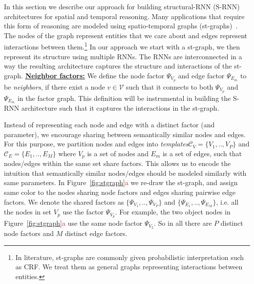 \documentclass[10pt,twocolumn,letterpaper]{article}
\newcommand{\mcal}[1]{\mathcal{#1}}
\newcommand{\rc}[1]{\textcolor{red}{#1}}
\begin{document}
In this section we describe our approach for building structural-RNN (S-RNN) architectures for spatial and temporal reasoning. Many applications that  require this form of reasoning are modeled using spatio-temporal graphs (st-graphs)~\cite{X}. The nodes of the graph represent entities that we care about and edges represent interactions between them.\footnote{In literature, st-graphs are commonly given probabilistic interpretation such as CRF. We treat them as general graphs representing interactions between entities.} In our approach we start with a st-graph, we then represent its structure using multiple RNNs. The RNNs are interconnected in a way the resulting architecture captures the structure and interactions of the st-graph. 
\fi\iffalse\noindent\textbf{\underline{Neighbor factors:}} We define the node factor $\Psi_{V_p}$ and edge factor $\Psi_{E_m}$ to be \textit{neighbors}, if there exist a node $v \in \mcal{V}$ such that it connects to both $\Psi_{V_p}$ and $\Psi_{E_m}$ in the factor graph. This definition will be instrumental in building the S-RNN architecture such that it captures the interactions in the st-graph.

Instead of representing each node and edge  with a distinct factor (and parameter), we encourage sharing between semantically similar nodes and edges. For this purpose, we partition nodes and edges into \textit{templates}$\mcal{C}_V=\{V_1,..,V_P\}$ and $\mcal{C}_E=\{E_1,..,E_M\}$ where $V_p$ is a set of nodes and $E_m$ is a set of edges, such that nodes/edges within the same set share factors. This allows us to encode the intuition that semantically similar nodes/edges should be modeled similarly with same parameters. In Figure~\ref{fig:stgraph}\rc{a} we re-draw the st-graph, and assign same color to the nodes sharing node factors and edges sharing pairwise edge factors. We denote the shared factors as $\{\Psi_{V_1},..,\Psi_{V_P}\}$ and $\{\Psi_{E_1},..,\Psi_{E_M}\}$, i.e. all the nodes in set $V_p$ use the factor $\Psi_{V_p}$.  For example, the two object nodes in Figure~\ref{fig:stgraph}\rc{a} use the same node factor $\Psi_{V_2}$.  So in all there are $P$ distinct node factors and $M$ distinct edge factors.  
\end{document}
